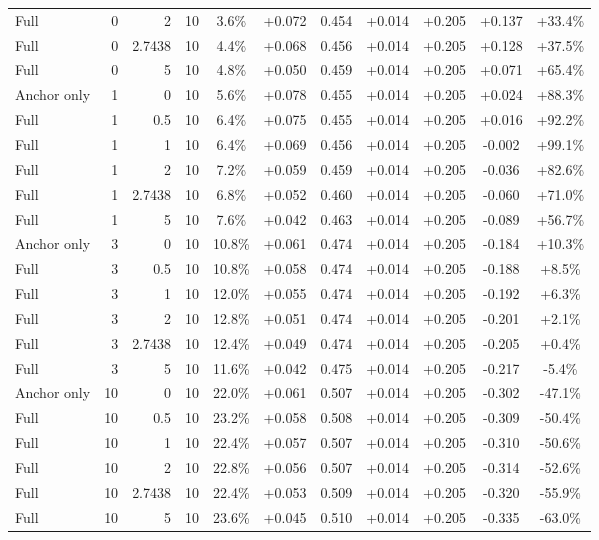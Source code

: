 \begin{table}[htbp]
\begin{tabular}{lrrrccccccc}
Full & 0 & 2 & 10 & 3.6\% & +0.072 & 0.454 & +0.014 & +0.205 & +0.137 & +33.4\% \\
Full & 0 & 2.7438 & 10 & 4.4\% & +0.068 & 0.456 & +0.014 & +0.205 & +0.128 & +37.5\% \\
Full & 0 & 5 & 10 & 4.8\% & +0.050 & 0.459 & +0.014 & +0.205 & +0.071 & +65.4\% \\
Anchor only & 1 & 0 & 10 & 5.6\% & +0.078 & 0.455 & +0.014 & +0.205 & +0.024 & +88.3\% \\
Full & 1 & 0.5 & 10 & 6.4\% & +0.075 & 0.455 & +0.014 & +0.205 & +0.016 & +92.2\% \\
Full & 1 & 1 & 10 & 6.4\% & +0.069 & 0.456 & +0.014 & +0.205 & -0.002 & +99.1\% \\
Full & 1 & 2 & 10 & 7.2\% & +0.059 & 0.459 & +0.014 & +0.205 & -0.036 & +82.6\% \\
Full & 1 & 2.7438 & 10 & 6.8\% & +0.052 & 0.460 & +0.014 & +0.205 & -0.060 & +71.0\% \\
Full & 1 & 5 & 10 & 7.6\% & +0.042 & 0.463 & +0.014 & +0.205 & -0.089 & +56.7\% \\
Anchor only & 3 & 0 & 10 & 10.8\% & +0.061 & 0.474 & +0.014 & +0.205 & -0.184 & +10.3\% \\
Full & 3 & 0.5 & 10 & 10.8\% & +0.058 & 0.474 & +0.014 & +0.205 & -0.188 & +8.5\% \\
Full & 3 & 1 & 10 & 12.0\% & +0.055 & 0.474 & +0.014 & +0.205 & -0.192 & +6.3\% \\
Full & 3 & 2 & 10 & 12.8\% & +0.051 & 0.474 & +0.014 & +0.205 & -0.201 & +2.1\% \\
Full & 3 & 2.7438 & 10 & 12.4\% & +0.049 & 0.474 & +0.014 & +0.205 & -0.205 & +0.4\% \\
Full & 3 & 5 & 10 & 11.6\% & +0.042 & 0.475 & +0.014 & +0.205 & -0.217 & -5.4\% \\
Anchor only & 10 & 0 & 10 & 22.0\% & +0.061 & 0.507 & +0.014 & +0.205 & -0.302 & -47.1\% \\
Full & 10 & 0.5 & 10 & 23.2\% & +0.058 & 0.508 & +0.014 & +0.205 & -0.309 & -50.4\% \\
Full & 10 & 1 & 10 & 22.4\% & +0.057 & 0.507 & +0.014 & +0.205 & -0.310 & -50.6\% \\
Full & 10 & 2 & 10 & 22.8\% & +0.056 & 0.507 & +0.014 & +0.205 & -0.314 & -52.6\% \\
Full & 10 & 2.7438 & 10 & 22.4\% & +0.053 & 0.509 & +0.014 & +0.205 & -0.320 & -55.9\% \\
Full & 10 & 5 & 10 & 23.6\% & +0.045 & 0.510 & +0.014 & +0.205 & -0.335 & -63.0\% \\

\end{tabular}
\end{table}
